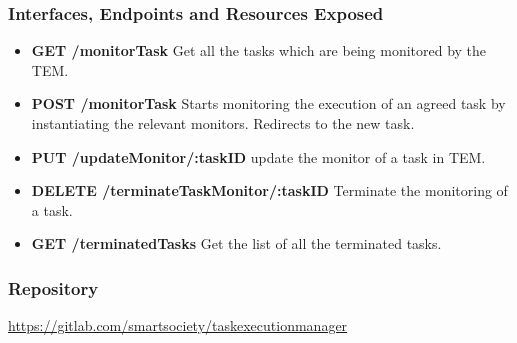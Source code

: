 \subsubsection{Interfaces, Endpoints and Resources Exposed}
\begin{itemize}
\item {\bf GET /monitorTask} Get all the tasks which are being monitored by the TEM.
\item {\bf POST /monitorTask} Starts monitoring the execution of an agreed task by instantiating the relevant monitors. Redirects to the new task.
\item {\bf PUT /updateMonitor/:taskID} update the monitor of a task in TEM.
\item {\bf DELETE /terminateTaskMonitor/:taskID} Terminate the monitoring of a task.
\item {\bf GET /terminatedTasks} Get the list of all the terminated tasks.
\end{itemize}
\subsubsection{Repository}
\url{https://gitlab.com/smartsociety/taskexecutionmanager}